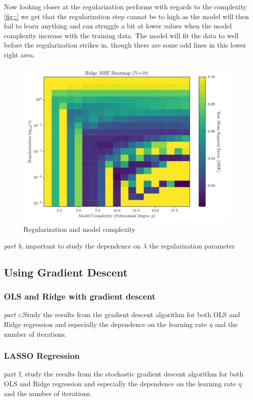\documentclass[amssymb,twocolumn,aps]{revtex4}
\begin{document}
Now looking closer at the regularization performs with regards to the complexity \ref{fig::} we get that the regularization step cannot be to high as the model will then fail to learn anything and can struggle a bit at lower values when the model complexity increase with the training data.
The model will fit the data to well before the regularization strikes in, though there are some odd lines in this lower right area.


\begin{figure}[h]
    \centering
    \includegraphics[width=.95 \linewidth]{Figures/Ridge_Degree_Lambda_Heatmap.pdf}
    \caption{Regularization and model complexity}
    \label{fig:}
\end{figure}

\textit{part b}, important to study the dependence on $\lambda$ the regularization parameter

\subsection{Using Gradient Descent}

\subsubsection{OLS and Ridge with gradient descent}
\textit{part c},Study the results from the gradient descent algorithm for both OLS and Ridge regression and especially the dependence on the learning rate $\eta$ and the number of iterations.

\subsubsection{LASSO Regression}
part f, study the results from the stochastic gradient descent algorithm for both OLS and Ridge regression and especially the dependence on the learning rate $\eta$ and the number of iterations.
\end{document}
